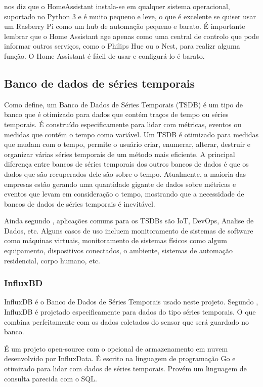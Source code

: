 \cite{AlmeidaCosta} nos diz que o HomeAssistant instala-se em qualquer sistema operacional, suportado no Python 3 e é muito pequeno e leve, o que é excelente se quiser usar um Rasberry Pi como um hub de automação pequeno e barato. É importante lembrar que o Home Assistant age apenas como uma central de controlo que pode informar outros serviços, como o Philips Hue ou o Nest, para realizr alguma função. O Home Assistant é fácil de usar e configurá-lo é barato.

\subsection{Banco de dados de séries temporais}

Como \cite{Noor2017} define, um Banco de Dados de Séries Temporais (TSDB) é um tipo de banco que é otimizado para dados que contém traços de tempo ou séries temporais. É construído especificamente para lidar com métricas, eventos ou medidas que contém o tempo como variável. Um TSDB é otimizado para medidas que mudam com o tempo, permite o usuário criar, enumerar, alterar, destruir e organizar várias séries temporais de um método mais eficiente. A principal diferença entre bancos de séries temporais dos outros bancos de dados é que os dados que são recuperados dele são sobre o tempo. Atualmente, a maioria das empresas estão gerando uma quantidade gigante de dados sobre métricas e eventos que levam em consideração o tempo, mostrando que a necessidade de bancos de dados de séries temporais é inevitável.

Ainda segundo \cite{Noor2017}, aplicações comuns para os TSDBs são IoT, DevOps, Analise de Dados, etc. Alguns casos de uso incluem monitoramento de sistemas de software como máquinas virtuais, monitoramento de sistemas físicos como algum equipamento, dispositivos conectados, o ambiente, sistemas de automação residencial, corpo humano, etc.

\subsubsection{InfluxBD}

InfluxDB é o Banco de Dados de Séries Temporais usado neste projeto. Segundo \cite{Lundrigan2017}, InfluxDB é projetado especificamente para dados do tipo séries temporais. O que combina perfeitamente com os dados coletados do sensor que será guardado no banco.

É um projeto open-source com o opcional de armazenamento em nuvem desenvolvido por InfluxData. É escrito na linguagem de programação Go e otimizado para lidar com dados de séries temporais. Provém um linguagem de consulta parecida com o SQL. \cite{Noor2017}

